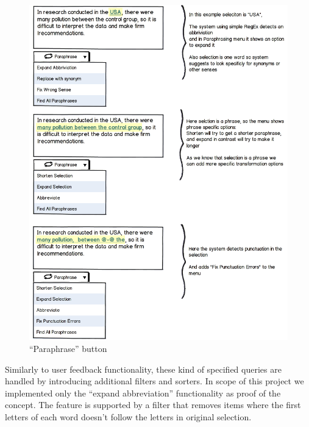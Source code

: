 \begin{figure}
 \centering 
 \includegraphics[scale=0.8]{g/button.png}
 \caption{``Paraphrase'' button}
\end{figure}

Similarly to user feedback functionality, these kind of specified queries are handled by introducing additional filters and sorters. In scope of this project we implemented only the ``expand abbreviation'' functionality as proof of the concept. The feature is supported by a filter that removes items where the first letters of each word doesn't follow the letters in original selection.
